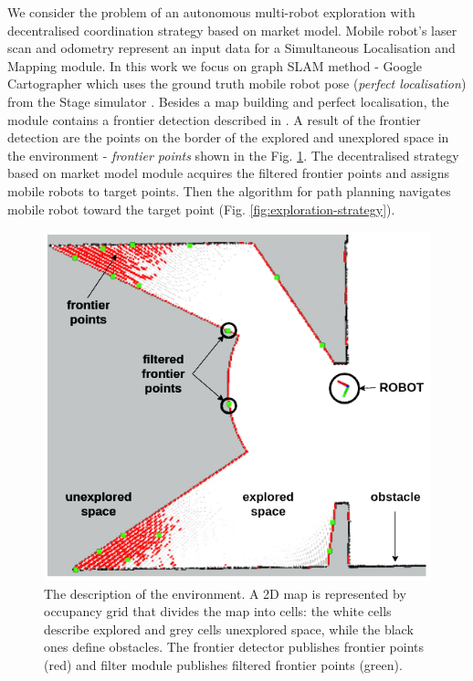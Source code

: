 \documentclass[letterpaper, 10 pt, conference]{ieeeconf}  %
\begin{document}
We consider the problem of an autonomous multi-robot exploration with decentralised coordination strategy based on market model. Mobile robot's laser scan and odometry represent an input data for a Simultaneous Localisation and Mapping module. In this work we focus on graph SLAM method - Google Cartographer \cite{cartographer} which uses the ground truth mobile robot pose (\textit {perfect localisation}) from the Stage simulator \cite{Stage}. Besides a map building and perfect localisation, the module contains a frontier detection described in \cite{juraj}. A result of the frontier detection are the points on the border of the explored and unexplored space in the environment - \textit{frontier points} shown in the Fig. \ref{fig:environment}. The decentralised strategy based on market model module acquires the filtered frontier points and assigns mobile robots to target points. Then the algorithm for path planning navigates mobile robot toward the target point (Fig. \ref{fig:exploration-strategy}).      

\begin{figure}[t]
	\centering\includegraphics[width=0.85\columnwidth]{frontier_rviz_vol3.png}
	\caption {The description of the environment. A 2D map is represented by occupancy grid that divides the map into cells: the white cells describe explored and grey cells unexplored space, while the black ones define obstacles. The frontier detector publishes frontier points (red) and filter module publishes filtered frontier points (green).}
	\label{fig:environment}
\end{figure}
\end{document}
